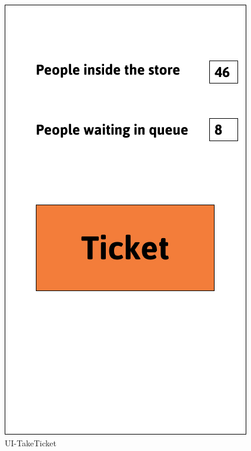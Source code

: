 \documentclass[a4paper,12pt]{report}
\begin{document}
\begin{figure}[H]
\begin{minipage}[t]{0.56\linewidth}
		\includegraphics[scale=0.56]{UI-TakeTicket.png}
		\caption{UI-TakeTicket}
		\label{fig:UI-TakeTicket}
	\end{minipage}
\end{figure}
\end{document}
